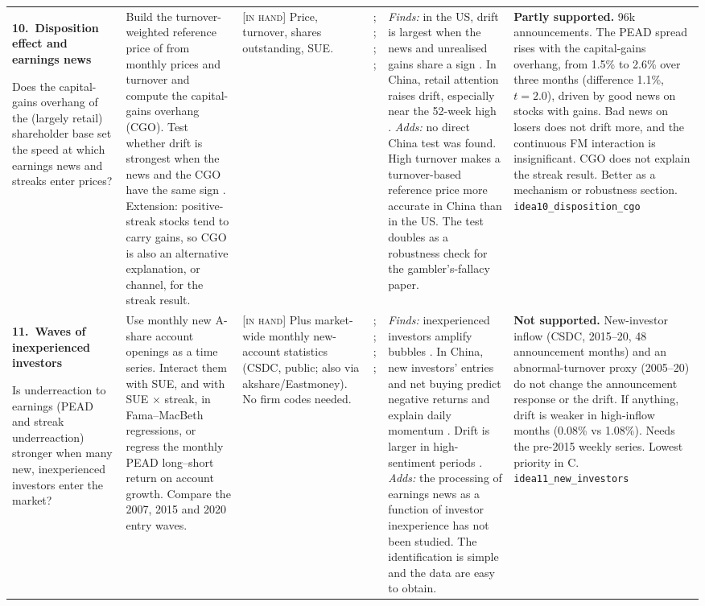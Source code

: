\documentclass[10pt]{article}
\newcommand{\idea}[2]{\textbf{#1.\ #2}\par\smallskip}
\newcommand{\inhand}{\textsc{[in hand]}}
\begin{document}
{\begin{longtable}{@{}L{3.2cm}L{4.4cm}L{2.5cm}L{3.0cm}L{5.4cm}L{5.8cm}@{}}
\idea{10}{Disposition effect and earnings news}
Does the capital-gains overhang of the (largely retail) shareholder base set the speed at which earnings news and
streaks enter prices?
&
Build the turnover-weighted reference price of \citet{grinblatt2005} from monthly prices and turnover and compute
the capital-gains overhang (CGO). Test whether drift is strongest when the news and the CGO have the same sign
\citep{frazzini2006}. Extension: positive-streak stocks tend to carry gains, so CGO is also an alternative
explanation, or channel, for the streak result.
&
\inhand{} Price, turnover, shares outstanding, SUE.
&
\citet{shefrin1985}; \citet{grinblatt2005}; \citet{frazzini2006}; \citet{an2016}; \citet{chen2022attn}
&
\emph{Finds:} in the US, drift is largest when the news and unrealised gains share a sign \citep{frazzini2006}. In
China, retail attention raises drift, especially near the 52-week high \citep{chen2022attn}. \emph{Adds:} no direct
China test was found. High turnover makes a turnover-based reference price more accurate in China than in the US.
The test doubles as a robustness check for the gambler's-fallacy paper.
&
\textbf{Partly supported.} 96k announcements. The PEAD spread rises with the capital-gains overhang, from 1.5\% to 2.6\% over three months (difference 1.1\%, $t=2.0$), driven by good news on stocks with gains. Bad news on losers does not drift more, and the continuous FM interaction is insignificant. CGO does not explain the streak result. Better as a mechanism or robustness section. \texttt{idea10\_disposition\_cgo}\\[4pt]

\idea{11}{Waves of inexperienced investors}
Is underreaction to earnings (PEAD and streak underreaction) stronger when many new, inexperienced investors enter
the market?
&
Use monthly new A-share account openings as a time series. Interact them with SUE, and with SUE $\times$ streak, in
Fama--MacBeth regressions, or regress the monthly PEAD long--short return on account growth. Compare the
2007, 2015 and 2020 entry waves.
&
\inhand{} Plus market-wide monthly new-account statistics (CSDC, public; also via akshare/Eastmoney). No firm codes
needed.
&
\citet{greenwood2009}; \citet{gao2023newinv}; \citet{sun2023}; \citet{chen2022attn}; \citet{liao2022}
&
\emph{Finds:} inexperienced investors amplify bubbles \citep{greenwood2009}. In China, new investors' entries and net
buying predict negative returns and explain daily momentum \citep{gao2023newinv}. Drift is larger in high-sentiment
periods \citep{sun2023}. \emph{Adds:} the processing of earnings news as a function of investor inexperience has not
been studied. The identification is simple and the data are easy to obtain.
&
\textbf{Not supported.} New-investor inflow (CSDC, 2015--20, 48 announcement months) and an abnormal-turnover proxy (2005--20) do not change the announcement response or the drift. If anything, drift is weaker in high-inflow months (0.08\% vs 1.08\%). Needs the pre-2015 weekly series. Lowest priority in C. \texttt{idea11\_new\_investors}\\[4pt]


\end{longtable}}
\end{document}
